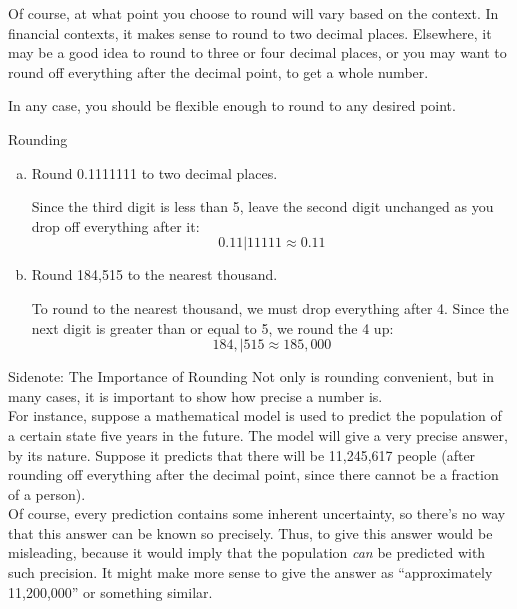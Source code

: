 Of course, at what point you choose to round will vary based on the context.  In financial contexts, it makes sense to round to two decimal places.  Elsewhere, it may be a good idea to round to three or four decimal places, or you may want to round off everything after the decimal point, to get a whole number.

In any case, you should be flexible enough to round to any desired point.

\begin{example}{Rounding}
\begin{enumerate}[(a)]
\item Round 0.1111111 to two decimal places.

\sol
Since the third digit is less than 5, leave the second digit unchanged as you drop off everything after it:
\[0.11\bigg|11111 \approx \boxed{0.11}\]

\solline
\item Round 184,515 to the nearest thousand.

\sol
To round to the nearest thousand, we must drop everything after 4.  Since the next digit is greater than or equal to 5, we round the 4 up:
\[184,\bigg|515 \approx \boxed{185,000}\]
\end{enumerate}
\end{example}

\begin{proc}{Sidenote: The Importance of Rounding}
Not only is rounding convenient, but in many cases, it is important to show how precise a number is.\\

For instance, suppose a mathematical model is used to predict the population of a certain state five years in the future.  The model will give a very precise answer, by its nature.  Suppose it predicts that there will be 11,245,617 people (after rounding off everything after the decimal point, since there cannot be a fraction of a person).  \\

Of course, every prediction contains some inherent uncertainty, so there's no way that this answer can be known so precisely.  Thus, to give this answer would be misleading, because it would imply that the population \textit{can} be predicted with such precision.  It might make more sense to give the answer as ``approximately 11,200,000'' or something similar.
\end{proc}

